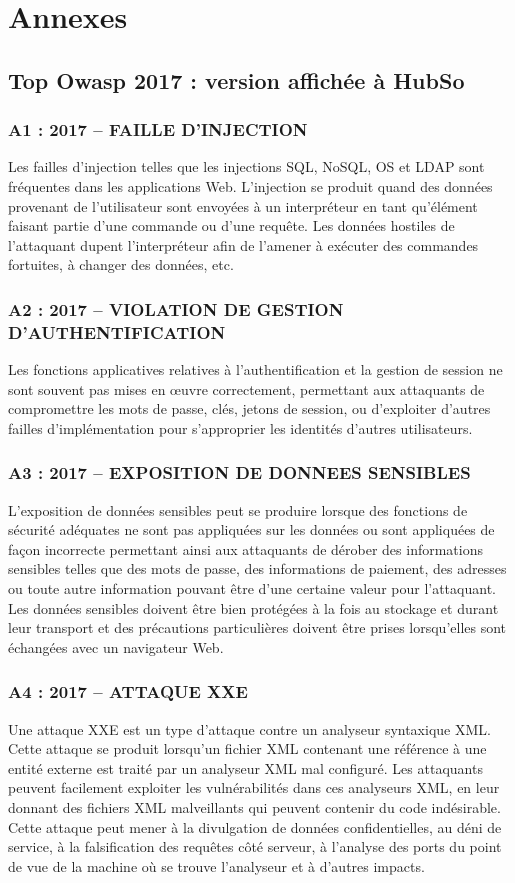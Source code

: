 \chapter*{Annexes}
\section*{Top Owasp 2017 : version affichée à HubSo}
\subsection*{A1 : 2017 – FAILLE D’INJECTION}
Les failles d’injection telles que les injections SQL, NoSQL, OS et LDAP sont fréquentes dans les applications Web. L'injection se produit quand des données provenant de l'utilisateur sont envoyées à un interpréteur en tant qu'élément faisant partie d'une commande ou d'une requête. Les données hostiles de l'attaquant dupent l'interpréteur afin de l'amener à exécuter des commandes fortuites, à changer des données, etc.
\subsection*{A2 : 2017 – VIOLATION DE GESTION D’AUTHENTIFICATION}
Les fonctions applicatives relatives à l'authentification et la gestion de session ne sont souvent pas mises en œuvre correctement, permettant aux attaquants de compromettre les mots de passe, clés, jetons de session, ou d'exploiter d'autres failles d'implémentation pour s'approprier les identités d'autres utilisateurs.
\subsection*{A3 : 2017 – EXPOSITION DE DONNEES SENSIBLES}
L’exposition de données sensibles peut se produire lorsque des fonctions de sécurité adéquates ne sont pas appliquées sur les données ou sont appliquées de façon incorrecte permettant ainsi  aux attaquants de dérober des informations sensibles telles que des mots de passe, des informations de paiement, des adresses ou toute autre information pouvant être d’une certaine valeur pour l’attaquant. Les données sensibles doivent être bien protégées à la fois au stockage et durant leur transport et des précautions particulières doivent être prises lorsqu’elles sont échangées avec un navigateur Web.
\subsection*{A4 : 2017 – ATTAQUE XXE}
Une attaque XXE est un type d’attaque contre un analyseur syntaxique XML. Cette attaque se produit lorsqu’un fichier XML contenant une référence à une entité externe est traité par un analyseur XML mal configuré. Les attaquants peuvent facilement exploiter les vulnérabilités dans ces analyseurs XML, en leur donnant des fichiers XML malveillants qui peuvent contenir du code indésirable. Cette attaque peut mener à la divulgation de données confidentielles, au déni de service, à la falsification des requêtes côté serveur, à l'analyse des ports du point de vue de la machine où se trouve l'analyseur et à d'autres impacts.
